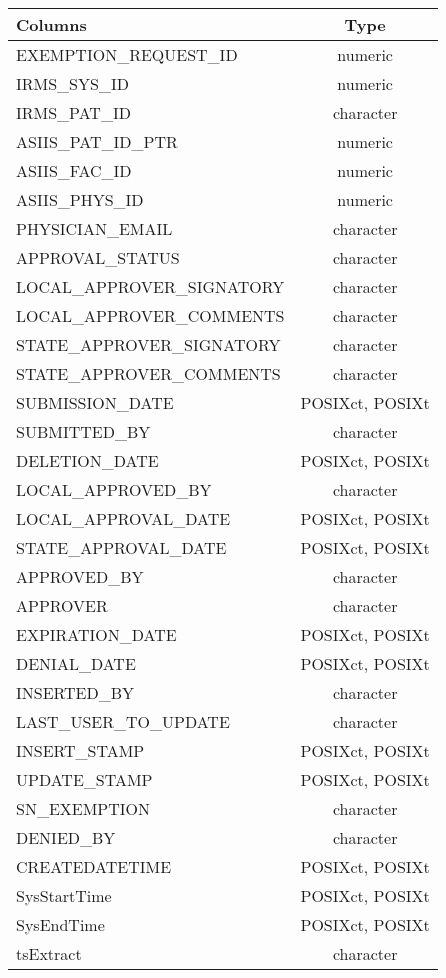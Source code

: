 \documentclass[
  letterpaper,
  DIV=11,
  numbers=noendperiod]{scrreprt}
\begin{document}
\begin{longtable}{lc}
\toprule
Columns & Type \\ 
\midrule
EXEMPTION\_REQUEST\_ID & numeric \\ 
IRMS\_SYS\_ID & numeric \\ 
IRMS\_PAT\_ID & character \\ 
ASIIS\_PAT\_ID\_PTR & numeric \\ 
ASIIS\_FAC\_ID & numeric \\ 
ASIIS\_PHYS\_ID & numeric \\ 
PHYSICIAN\_EMAIL & character \\ 
APPROVAL\_STATUS & character \\ 
LOCAL\_APPROVER\_SIGNATORY & character \\ 
LOCAL\_APPROVER\_COMMENTS & character \\ 
STATE\_APPROVER\_SIGNATORY & character \\ 
STATE\_APPROVER\_COMMENTS & character \\ 
SUBMISSION\_DATE & POSIXct, POSIXt \\ 
SUBMITTED\_BY & character \\ 
DELETION\_DATE & POSIXct, POSIXt \\ 
LOCAL\_APPROVED\_BY & character \\ 
LOCAL\_APPROVAL\_DATE & POSIXct, POSIXt \\ 
STATE\_APPROVAL\_DATE & POSIXct, POSIXt \\ 
APPROVED\_BY & character \\ 
APPROVER & character \\ 
EXPIRATION\_DATE & POSIXct, POSIXt \\ 
DENIAL\_DATE & POSIXct, POSIXt \\ 
INSERTED\_BY & character \\ 
LAST\_USER\_TO\_UPDATE & character \\ 
INSERT\_STAMP & POSIXct, POSIXt \\ 
UPDATE\_STAMP & POSIXct, POSIXt \\ 
SN\_EXEMPTION & character \\ 
DENIED\_BY & character \\ 
CREATEDATETIME & POSIXct, POSIXt \\ 
SysStartTime & POSIXct, POSIXt \\ 
SysEndTime & POSIXct, POSIXt \\ 
tsExtract & character \\ 
\bottomrule
\end{longtable}
\end{document}
